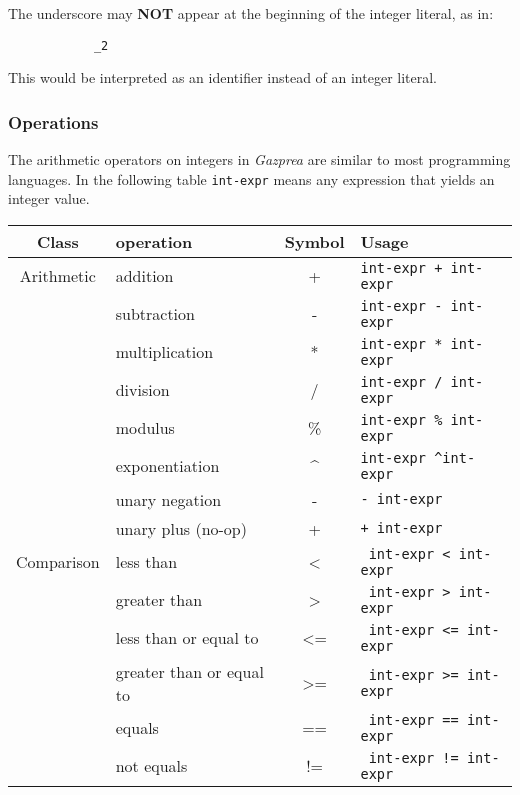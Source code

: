 \documentclass[../../gazprea.tex]{subfiles}
\begin{document}
		The underscore may \textbf{NOT} appear at the beginning of the integer literal, as in:

		\begin{lstlisting}
			_2
		\end{lstlisting}

		This would be interpreted as an identifier instead of an integer literal.

	\subsubsection{Operations}

		The arithmetic operators on integers in \textit{Gazprea} are similar to most programming languages. In the
		following table \texttt{int-expr} means any expression that yields an integer value.

		\begin{center}
			\begin{tabular}{|c|l|c|l|}
				\hline
				\textbf{Class} & \textbf{operation} & \textbf{Symbol} & \textbf{Usage} \\
				\hline
				Arithmetic & addition           & +  & \texttt{int-expr + int-expr}  \\
				           & subtraction        & -  &  \texttt{int-expr - int-expr} \\
				           & multiplication     & *  & \texttt{int-expr * int-expr}	 \\
				           & division           & /  & \texttt{int-expr / int-expr}	 \\
				           & modulus            & \% & \texttt{int-expr \% int-expr} \\
				           & exponentiation     & \textasciicircum & \texttt{int-expr \textasciicircum int-expr}	\\
				           & unary negation     & -  & \texttt{- int-expr}	         \\
				           & unary plus (no-op) & +  & \texttt{+ int-expr}           \\
				\hline
				Comparison & less than                & <  & \texttt{ int-expr < int-expr}  \\
				           & greater than             & >  & \texttt{ int-expr > int-expr}  \\
				           & less than or equal to    & <= & \texttt{ int-expr <= int-expr} \\
				           & greater than or equal to & >= & \texttt{ int-expr >= int-expr} \\
				           & equals                   & == & \texttt{ int-expr == int-expr} \\
				           & not equals               & != & \texttt{ int-expr != int-expr} \\
				\hline
			\end{tabular}
		\end{center}
\end{document}
